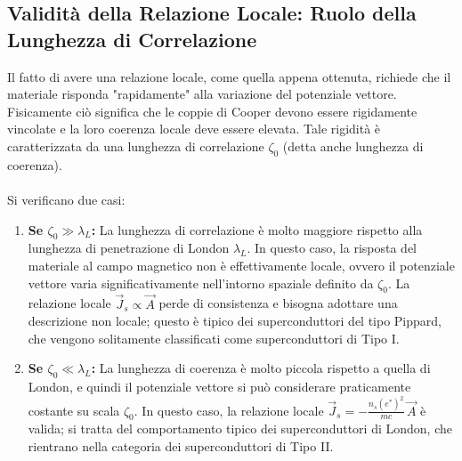 \subsection{Validità della Relazione Locale: Ruolo della Lunghezza di Correlazione }
Il fatto di avere una relazione locale, come quella appena ottenuta, richiede che il materiale risponda "rapidamente" alla variazione del potenziale vettore. Fisicamente ciò significa che le coppie di Cooper devono essere rigidamente vincolate e la loro coerenza locale deve essere elevata. Tale rigidità è caratterizzata da una lunghezza di correlazione \(\zeta_0\) (detta anche lunghezza di coerenza).\\\\
Si verificano due casi:
\begin{enumerate}
    \item \textbf{Se \(\zeta_0 \gg \lambda_L\):}  
    La lunghezza di correlazione è molto maggiore rispetto alla lunghezza di penetrazione di London \(\lambda_L\). In questo caso, la risposta del materiale al campo magnetico non è effettivamente locale, ovvero il potenziale vettore varia significativamente nell'intorno spaziale definito da \(\zeta_0\). La relazione locale \(\vec{J}_s \propto \vec{A}\) perde di consistenza e bisogna adottare una descrizione non locale; questo è tipico dei superconduttori del tipo Pippard, che vengono solitamente classificati come superconduttori di Tipo I.
    
    \item \textbf{Se \(\zeta_0 \ll \lambda_L\):}  
    La lunghezza di coerenza è molto piccola rispetto a quella di London, e quindi il potenziale vettore si può considerare praticamente costante su scala \(\zeta_0\). In questo caso, la relazione locale \(\vec{J}_s = -\frac{n_s (e^*)^2}{mc}\, \vec{A}\) è valida; si tratta del comportamento tipico dei superconduttori di London, che rientrano nella categoria dei superconduttori di Tipo II.

\end{enumerate}

